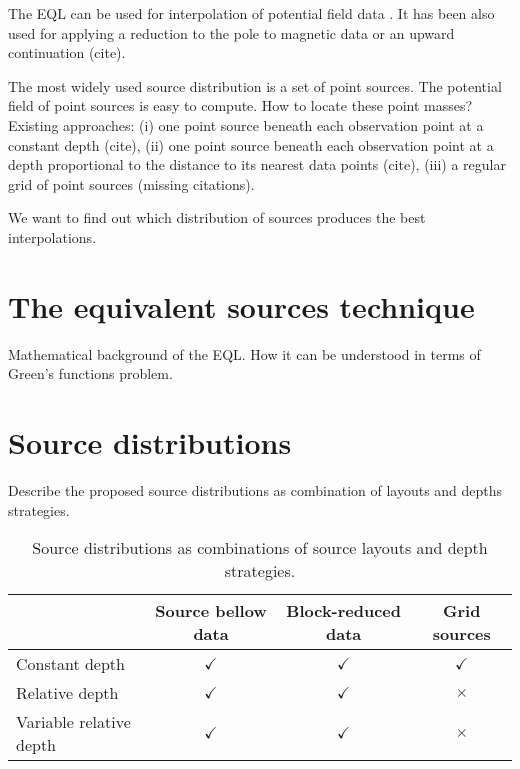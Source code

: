 \documentclass[twocolumn]{article}
\begin{document}
The EQL can be used for interpolation of potential field data \citep{cordell1992,
cooper2000}.
It has been also used for applying a reduction to the pole to magnetic data
\citep{guspi2009, silva1986, emilia1973, nakatsuka2006} or an upward continuation
(cite).

The most widely used source distribution is a set of point sources.
The potential field of point sources is easy to compute.
How to locate these point masses?
Existing approaches:
(i) one point source beneath each observation point at a constant depth (cite),
(ii) one point source beneath each observation point at a depth proportional to the
distance to its nearest data points (cite),
(iii) a regular grid of point sources (missing citations).

We want to find out which distribution of sources produces the best interpolations.



\section{The equivalent sources technique}

Mathematical background of the EQL\@.
How it can be understood in terms of Green's functions problem.



\section{Source distributions}

Describe the proposed source distributions as combination of layouts and depths
strategies.

\begin{table*}
    \begin{minipage}{80mm}
        \caption{
            Source distributions as combinations of source layouts and depth
            strategies.
        }
        \label{tab:source-distributions}
        \begin{tabular}{lccc}
            & Source bellow data & Block-reduced data & Grid sources \\ \hline
            Constant depth          & $\checkmark$ & $\checkmark$ & $\checkmark$ \\
            Relative depth          & $\checkmark$ & $\checkmark$ & $\times$     \\
            Variable relative depth & $\checkmark$ & $\checkmark$ & $\times$     \\
        \end{tabular}
    \end{minipage}
\end{table*}
\end{document}

